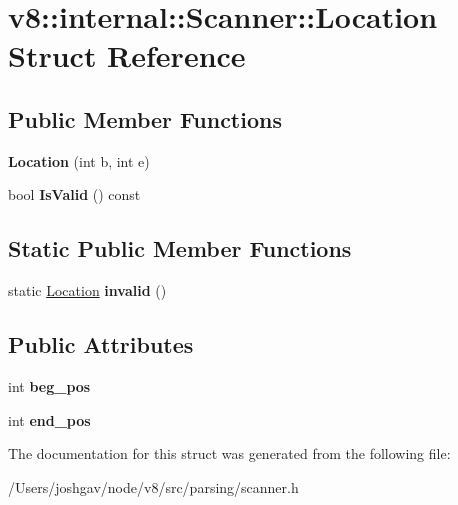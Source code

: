 \hypertarget{structv8_1_1internal_1_1_scanner_1_1_location}{}\section{v8\+:\+:internal\+:\+:Scanner\+:\+:Location Struct Reference}
\label{structv8_1_1internal_1_1_scanner_1_1_location}
\subsection*{Public Member Functions}
\begin{DoxyCompactItemize}
\item 
{\bfseries Location} (int b, int e)\hypertarget{structv8_1_1internal_1_1_scanner_1_1_location_af089d35d57d66e0ff0e4558ce445494d}{}\label{structv8_1_1internal_1_1_scanner_1_1_location_af089d35d57d66e0ff0e4558ce445494d}

\item 
bool {\bfseries Is\+Valid} () const \hypertarget{structv8_1_1internal_1_1_scanner_1_1_location_afd64e4ffc011749e6799302045df3428}{}\label{structv8_1_1internal_1_1_scanner_1_1_location_afd64e4ffc011749e6799302045df3428}

\end{DoxyCompactItemize}
\subsection*{Static Public Member Functions}
\begin{DoxyCompactItemize}
\item 
static \hyperlink{structv8_1_1internal_1_1_scanner_1_1_location}{Location} {\bfseries invalid} ()\hypertarget{structv8_1_1internal_1_1_scanner_1_1_location_aca07bb7c787fa37e598ec7a18d947ac5}{}\label{structv8_1_1internal_1_1_scanner_1_1_location_aca07bb7c787fa37e598ec7a18d947ac5}

\end{DoxyCompactItemize}
\subsection*{Public Attributes}
\begin{DoxyCompactItemize}
\item 
int {\bfseries beg\+\_\+pos}\hypertarget{structv8_1_1internal_1_1_scanner_1_1_location_a04a6e70dca2ccfa5072520c84de16eab}{}\label{structv8_1_1internal_1_1_scanner_1_1_location_a04a6e70dca2ccfa5072520c84de16eab}

\item 
int {\bfseries end\+\_\+pos}\hypertarget{structv8_1_1internal_1_1_scanner_1_1_location_a0beaf28ea5c585f2560af74bb2c53ab4}{}\label{structv8_1_1internal_1_1_scanner_1_1_location_a0beaf28ea5c585f2560af74bb2c53ab4}

\end{DoxyCompactItemize}


The documentation for this struct was generated from the following file\+:\begin{DoxyCompactItemize}
\item 
/\+Users/joshgav/node/v8/src/parsing/scanner.\+h\end{DoxyCompactItemize}
